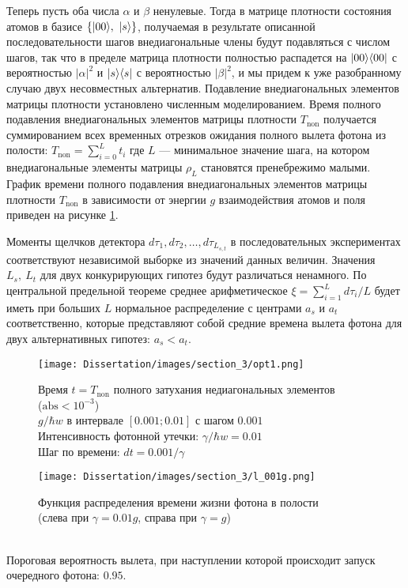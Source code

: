 Теперь пусть оба числа $\alpha$ и $\beta$ ненулевые. Тогда в матрице плотности состояния атомов в базисе $\{|00\rangle,~|s\rangle\}$, получаемая в результате описанной последовательности шагов внедиагональные члены будут подавляться с числом шагов, так что в пределе матрица плотности полностью распадется на $|00\rangle\langle 00|$ с вероятностью $|\alpha|^2$ и $|s\rangle\langle s|$ с вероятностью $|\beta|^2$, и мы придем к уже разобранному случаю двух несовместных альтернатив. Подавление внедиагональных элементов матрицы плотности установлено численным моделированием. Время полного подавления внедиагональных элементов матрицы плотности $T_{\text{non}}$ получается суммированием всех временных отрезков ожидания полного вылета фотона из полости: $T_{\text{non}}=\sum\limits_{i=0}^Lt_i$ где $L$ --- минимальное значение шага, на котором внедиагональные элементы матрицы $\rho_L$ становятся пренебрежимо малыми. График времени полного подавления внедиагональных элементов матрицы плотности $T_{\text{non}}$ в зависимости от энергии $g$ взаимодействия атомов и поля приведен на рисунке \ref{fig:decoh}. 

Моменты щелчков детектора $d\tau_1,d\tau_2,\dots,d\tau_{L_{s,t}}$ в последовательных экспериментах соответствуют независимой выборке из значений данных величин. Значения $L_s,~L_t$ для двух конкурирующих гипотез будут различаться ненамного. По центральной предельной теореме среднее арифметическое $\xi=\sum\limits_{i=1}^Ld\tau_{i}/L$ будет иметь при больших $L$ нормальное распределение с центрами $a_s$ и $a_t$ соответственно, которые представляют собой средние времена вылета фотона для двух альтернативных гипотез: $a_{s}<a_{t}$. 

\clearpage
\begin{figure}[h!]
	\noindent\centering\texttt{[image: Dissertation/images/section\_3/opt1.png]}
	\captionsetup{format=hang,width=1.0\textwidth,justification=centering,singlelinecheck=no}
	
	\caption{
		{\small
			Время $t=T_{\text{non}}$ полного затухания недиагональных элементов\\($\mathrm{abs} < 10^{-3}$)\\[12pt]
			$g/\hbar w$ в интервале $[0.001; 0.01]$ с шагом $0.001$\\
			Интенсивность фотонной утечки: $\gamma / \hbar w = 0.01$\\
			Шаг по времени: $dt = 0.001 /\gamma$
		}
	}
	\label{fig:decoh}
\end{figure}

\begin{figure}[h!]
	\noindent\centering\texttt{[image: Dissertation/images/section\_3/l\_001g.png]}
	\caption{
		{\small
			Функция распределения времени жизни фотона в полости\\(слева при $\gamma=0.01g$, справа при $\gamma=g$)
		}
	}
	\label{fig:0.01}
\end{figure}
\
\\
\noindent Пороговая вероятность вылета, при наступлении которой происходит запуск очередного фотона: $0.95$.

